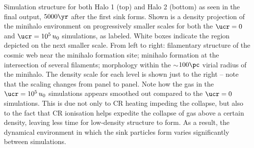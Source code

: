 \label{fig:structure}
Simulation structure for both Halo 1 (top) and Halo 2 (bottom) as seen in the final output, $5000\yr$ after the first sink forms.  Shown is a density projection of the minihalo environment on progressively smaller scales for both the $\ucr=0$ and $\ucr=10^5\,u_0$ simulations, as labeled.  White boxes indicate the region depicted on the next smaller scale.  From left to right: filamentary structure of the cosmic web near the minihalo formation site; minihalo formation at the intersection of several filaments; morphology within the $\sim$$100\pc$ virial radius of the minihalo. The density scale for each level is shown just to the right -- note that the scaling changes from panel to panel. Note how the gas in the $\ucr=10^5\,u_0$ simulations appears smoothed out compared to the $\ucr=0$ simulations.  This is due not only to CR heating impeding the collapse, but also to the fact that CR ionisation helps expedite the collapse of gas above a certain density, leaving less time for low-density structure to form.  As a result, the dynamical environment in which the sink particles form varies significantly between simulations.